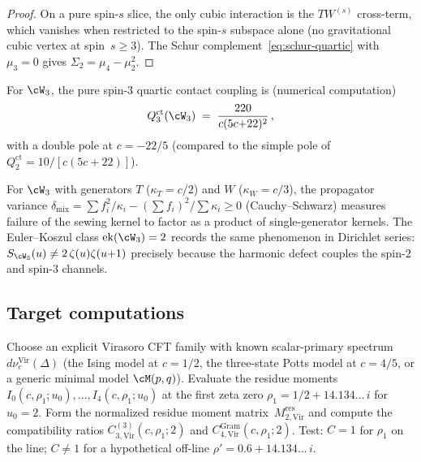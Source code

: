 \begin{proof}
On a pure spin-$s$ slice, the only cubic interaction
is the $TW^{(s)}$ cross-term, which vanishes when
restricted to the spin-$s$ subspace alone (no gravitational
cubic vertex at spin~$s \geq 3$).
The Schur complement~\eqref{eq:schur-quartic}
with $\mu_3 = 0$ gives $\Sigma_2 = \mu_4 - \mu_2^2$.
\end{proof}

For $\cW_3$, the pure spin-$3$ quartic contact coupling is
(numerical computation)
\begin{equation}\label{eq:w3-spin3-quartic}
Q_3^{\mathrm{ct}}(\cW_3)
\;=\;
\frac{220}{c(5c{+}22)^2}\,,
\end{equation}
with a double pole at $c = -22/5$ (compared to the
simple pole of $Q_2^{\mathrm{ct}} = 10/[c(5c{+}22)]$).

\begin{remark}%
\label{rem:propagator-variance-euler}%
%
For $\cW_3$ with generators $T$ ($\kappa_T = c/2$) and $W$
($\kappa_W = c/3$), the propagator variance
$\delta_{\mathrm{mix}} = \sum f_i^2/\kappa_i -
(\sum f_i)^2/\sum\kappa_i \geq 0$ (Cauchy--Schwarz)
measures failure of the sewing kernel to factor as a product
of single-generator kernels.
The Euler--Koszul class $\operatorname{ek}(\cW_3) = 2$
records the same phenomenon in Dirichlet series:
$S_{\cW_3}(u) \neq 2\,\zeta(u)\zeta(u{+}1)$ precisely
because the harmonic defect couples the spin-$2$ and spin-$3$
channels.
\end{remark}

\subsection{Target computations}%
\label{sec:target-computations}

\begin{problem}%
\label{prob:virasoro-residue-evaluation}%
%
Choose an explicit Virasoro CFT family with known
scalar-primary spectrum $d\nu_c^{\mathrm{Vir}}(\Delta)$
(the Ising model at $c = 1/2$, the three-state Potts model
at $c = 4/5$, or a generic minimal model $\cM(p,q)$).
Evaluate the residue moments
$I_0(c,\rho_1;u_0), \ldots, I_4(c,\rho_1;u_0)$
at the first zeta zero $\rho_1 = 1/2 + 14.134\ldots\,i$
for $u_0 = 2$.
Form the normalized residue moment
matrix~$M_{2,\mathrm{Vir}}^{\mathrm{res}}$
and compute the compatibility ratios
$C_{3,\mathrm{Vir}}^{(3)}(c,\rho_1;2)$ and
$C_{4,\mathrm{Vir}}^{\mathrm{Gram}}(c,\rho_1;2)$.
Test: $C = 1$ for $\rho_1$ on the line;
$C \neq 1$ for a hypothetical off-line
$\rho' = 0.6 + 14.134\ldots\,i$.
\end{problem}

